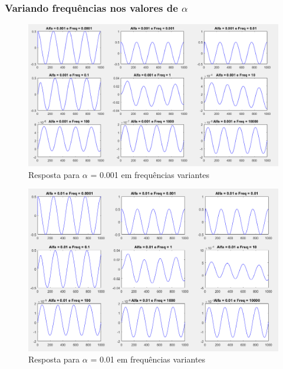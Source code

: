 \documentclass[a4paper, 12pt]{article}
\begin{document}
	\subsubsection{Variando frequências nos valores de $\alpha$}	
			\begin{figure}[!ht]
				\centering
				\includegraphics[scale=0.45]{img/3k_alfa1.png}
				\caption{Resposta para $\alpha$ = 0.001 em frequências variantes}	
			\end{figure}		
			\begin{figure}[!ht]
				\centering
				\includegraphics[scale=0.48]{img/3k_alfa2.png}
				\caption{Resposta para $\alpha$ = 0.01 em frequências variantes}	
			\end{figure}			
\end{document}
